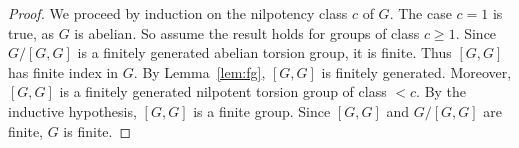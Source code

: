 \begin{proof}
We proceed by induction on the nilpotency class $c$ of $G$. The case
$c=1$ is true, as $G$ is abelian. So assume the result holds for 
groups of class $c\geq1$. Since $G/[G,G]$ is a finitely generated abelian torsion group, 
it is finite. Thus $[G,G]$ has finite index in $G$. By Lemma~\ref{lem:fg}, 
$[G,G]$ is finitely generated. Moreover, $[G,G]$ is a finitely generated 
nilpotent torsion group of class  $<c$.  
By the inductive hypothesis, 
$[G,G]$ is a finite group. Since $[G,G]$ and $G/[G,G]$ are finite, 
$G$ is finite. %
\end{proof}

%
%
%



